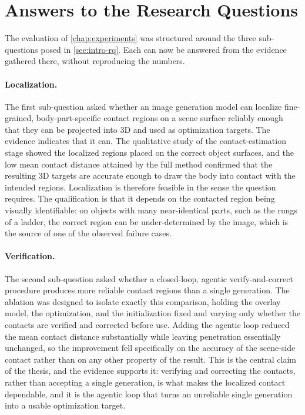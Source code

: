 \section{Answers to the Research Questions}
\label{sec:conclusion-rq}

The evaluation of \cref{chap:experiments} was structured around the three sub-questions posed in \cref{sec:intro-rq}. Each can now be answered from the evidence gathered there, without reproducing the numbers.

\paragraph{Localization.} The first sub-question asked whether an image generation model can localize fine-grained, body-part-specific contact regions on a scene surface reliably enough that they can be projected into 3D and used as optimization targets. The evidence indicates that it can. The qualitative study of the contact-estimation stage showed the localized regions placed on the correct object surfaces, and the low mean contact distance attained by the full method confirmed that the resulting 3D targets are accurate enough to draw the body into contact with the intended regions. Localization is therefore feasible in the sense the question requires. The qualification is that it depends on the contacted region being visually identifiable: on objects with many near-identical parts, such as the rungs of a ladder, the correct region can be under-determined by the image, which is the source of one of the observed failure cases.

\paragraph{Verification.} The second sub-question asked whether a closed-loop, agentic verify-and-correct procedure produces more reliable contact regions than a single generation. The ablation was designed to isolate exactly this comparison, holding the overlay model, the optimization, and the initialization fixed and varying only whether the contacts are verified and corrected before use. Adding the agentic loop reduced the mean contact distance substantially while leaving penetration essentially unchanged, so the improvement fell specifically on the accuracy of the scene-side contact rather than on any other property of the result. This is the central claim of the thesis, and the evidence supports it: verifying and correcting the contacts, rather than accepting a single generation, is what makes the localized contact dependable, and it is the agentic loop that turns an unreliable single generation into a usable optimization target.

